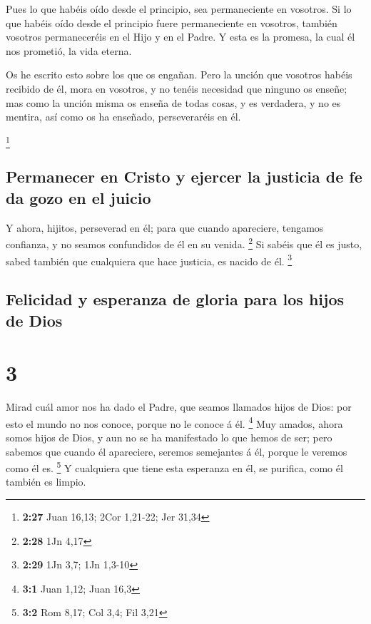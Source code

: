  Pues lo que habéis oído desde el principio, sea
permaneciente en vosotros. Si lo que habéis oído desde el principio
fuere permaneciente en vosotros, también vosotros permaneceréis en el
Hijo y en el Padre.  Y esta es la promesa, la cual él nos
prometió, la vida eterna.

 Os he escrito esto sobre los que os engañan.
 Pero la unción que vosotros habéis recibido de él, mora
en vosotros, y no tenéis necesidad que ninguno os enseñe; mas como la
unción misma os enseña de todas cosas, y es verdadera, y no es mentira,
así como os ha enseñado, perseveraréis en él.

\footnote{\textbf{2:27} Juan 16,13; 2Cor 1,21-22; Jer 31,34}

\hypertarget{permanecer-en-cristo-y-ejercer-la-justicia-de-fe-da-gozo-en-el-juicio}{%
\subsection{Permanecer en Cristo y ejercer la justicia de fe da gozo en
el
juicio}\label{permanecer-en-cristo-y-ejercer-la-justicia-de-fe-da-gozo-en-el-juicio}}

 Y ahora, hijitos, perseverad en él; para que cuando
apareciere, tengamos confianza, y no seamos confundidos de él en su
venida. \footnote{\textbf{2:28} 1Jn 4,17}  Si sabéis que
él es justo, sabed también que cualquiera que hace justicia, es nacido
de él. \footnote{\textbf{2:29} 1Jn 3,7; 1Jn 1,3-10}

\hypertarget{felicidad-y-esperanza-de-gloria-para-los-hijos-de-dios}{%
\subsection{Felicidad y esperanza de gloria para los hijos de
Dios}\label{felicidad-y-esperanza-de-gloria-para-los-hijos-de-dios}}

\hypertarget{section-2}{%
\section{3}\label{section-2}}

 Mirad cuál amor nos ha dado el Padre, que seamos llamados
hijos de Dios: por esto el mundo no nos conoce, porque no le conoce á
él. \footnote{\textbf{3:1} Juan 1,12; Juan 16,3}  Muy
amados, ahora somos hijos de Dios, y aun no se ha manifestado lo que
hemos de ser; pero sabemos que cuando él apareciere, seremos semejantes
á él, porque le veremos como él es. \footnote{\textbf{3:2} Rom 8,17; Col
  3,4; Fil 3,21}  Y cualquiera que tiene esta esperanza en
él, se purifica, como él también es limpio.

